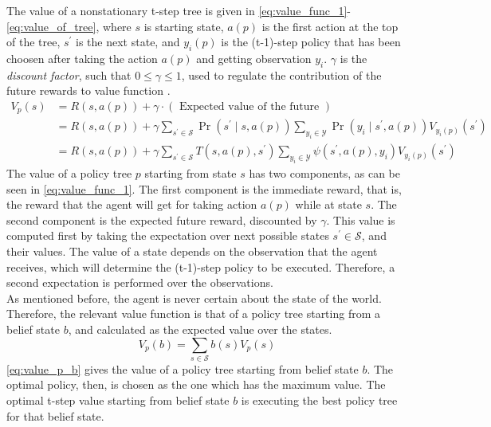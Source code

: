 The value of a nonstationary t-step tree is given in \autoref{eq:value_func_1}-\autoref{eq:value_of_tree}, where $ s $ is starting state, $ a(p) $ is the first action at the top of the tree, $ s^\prime $ is the next state, and $ y_{i}(p) $ is the (t-1)-step policy that has been choosen after taking the action $ a(p) $ and getting observation $ y_i $. $ \gamma $ is the \textit{discount factor}, such that $ 0\leq \gamma \leq 1 $, used to regulate the contribution of the future rewards to value function \cite{Sutton2018}.
\begin{align} 
V_{p}(s) &=R(s, a(p))+\gamma \cdot(\text { Expected value of the future }) \label{eq:value_func_1}\\
&=R(s, a(p))+\gamma \sum_{s^{\prime} \in \mathcal{S}} \operatorname{Pr}\left(s^{\prime} \mid s, a(p)\right) \sum_{y_{i} \in \mathcal{Y}} \operatorname{Pr}\left(y_{i} \mid s^{\prime}, a(p)\right) V_{y_{i}(p)}\left(s^{\prime}\right) \label{eq:value_func_2}\\
&=R(s, a(p))+\gamma \sum_{s^{\prime} \in \mathcal{S}} T\left(s, a(p), s^{\prime}\right) \sum_{y_{i} \in \mathcal{Y}} \psi\left(s^{\prime}, a(p), y_{i}\right) V_{y_{i}(p)}\left(s^{\prime}\right) 
\label{eq:value_of_tree}
\end{align}
The value of a policy tree $ p $ starting from state $ s $ has two components, as can be seen in \autoref{eq:value_func_1}. The first component is the immediate reward, that is, the reward that the agent will get for taking action $ a(p) $ while at state $ s $. The second component is the expected future reward, discounted by $ \gamma $. This value is computed first by taking the expectation over next possible states $ s^\prime \in \mathcal{S} $, and their values. The value of a state depends on the observation that the agent receives, which will determine the (t-1)-step policy to be executed. Therefore, a second expectation is performed over the observations. \\
As mentioned before, the agent is never certain about the state of the world. Therefore, the relevant value function is that of a policy tree starting from a belief state $ b $, and  calculated as the expected value over the states.
\begin{equation}
V_{p}(b)=\sum_{s \in \mathcal{S}} b(s) V_{p}(s)
\label{eq:value_p_b}
\end{equation}
\autoref{eq:value_p_b} gives the value of a policy tree starting from belief state $ b $. The optimal policy, then, is chosen as the one which has the maximum value. The optimal t-step value starting from belief state $ b $ is executing the best policy tree for that belief state.

